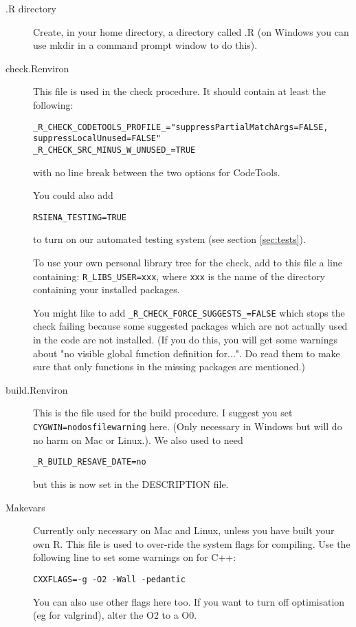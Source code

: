 \documentclass[12pt, a4paper]{article}
\renewcommand{\=}{\,=\,}
\newcommand{\+}{\,+\,}
\begin{document}
\begin{description}
\item[.R directory] Create, in your home directory, a directory called .R (on
  Windows you can use mkdir in a command prompt window to do this).
\item[check.Renviron] This file is used in the check procedure. It should
 contain at least the following:
{\small
\begin{verbatim}
_R_CHECK_CODETOOLS_PROFILE_="suppressPartialMatchArgs=FALSE,
suppressLocalUnused=FALSE"
_R_CHECK_SRC_MINUS_W_UNUSED_=TRUE
\end{verbatim}
}
with no line break between the two options for CodeTools.

You could also add
\begin{verbatim}
RSIENA_TESTING=TRUE
\end{verbatim}
to turn on our automated testing system (see section \ref{sec:tests}).

To use your own personal library tree for the check, add to this file a line
containing: \verb|R_LIBS_USER=xxx|, where \verb|xxx| is the name of the directory
containing your installed packages.

You might like to add \verb|_R_CHECK_FORCE_SUGGESTS_=FALSE| which stops the
check failing because some suggested packages which are not actually used in the
code are not installed. (If you do this, you will get some warnings about "no
visible global function definition for...". Do read them to make sure that only
functions in the missing packages are mentioned.)

\item[build.Renviron] This is the file used for the build procedure.  I suggest
  you set \verb|CYGWIN=nodosfilewarning| here. (Only necessary in Windows but
  will do no harm on Mac or Linux.). We also used to need
\begin{verbatim}
_R_BUILD_RESAVE_DATE=no
\end{verbatim}
but this is now set in the DESCRIPTION file.
\item[Makevars] Currently only necessary on Mac and Linux, unless you have built
  your own R. This file is used to over-ride the system flags for compiling. Use
  the following line to set some warnings on for C++:
 \begin{verbatim}
CXXFLAGS=-g -O2 -Wall -pedantic
\end{verbatim}
You can also use other flags here too.
If you want to turn off optimisation (eg for valgrind), alter the O2 to a O0.
\end{description}
\end{document}

